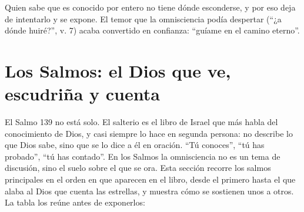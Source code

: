 Quien sabe que es conocido por entero no tiene dónde esconderse, y por eso deja de intentarlo y se expone. El temor que la omnisciencia podía despertar (``¿a dónde huiré?'', v. 7) acaba convertido en confianza: ``guíame en el camino eterno''.


\section{Los Salmos: el Dios que ve, escudriña y cuenta}

El Salmo 139 no está solo. El salterio es el libro de Israel que más habla del conocimiento de Dios, y casi siempre lo hace en segunda persona: no describe lo que Dios sabe, sino que se lo dice a él en oración. ``Tú conoces'', ``tú has probado'', ``tú has contado''. En los Salmos la omnisciencia no es un tema de discusión, sino el suelo sobre el que se ora. Esta sección recorre los salmos principales en el orden en que aparecen en el libro, desde el primero hasta el que alaba al Dios que cuenta las estrellas, y muestra cómo se sostienen unos a otros. La tabla los reúne antes de exponerlos:

